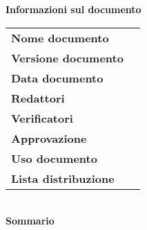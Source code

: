 \begin{center}
	\textbf{\Large Informazioni sul documento} \\[0.5cm]
	\begin{tabular}{ l | r }
		\textbf{Nome documento} & \doctitle \\
		\textbf{Versione documento} & \versiondoc \\
		\textbf{Data documento} & \datared \\
		\textbf{Redattori} & \redattore \\
		\textbf{Verificatori} & \verificatori \\
		\textbf{Approvazione} & \approvazione \\
		\textbf{Uso documento} & \usodoc \\
		\textbf{Lista distribuzione} & \listadistr \\
	\end{tabular} \\[1cm]
\textbf{\Large Sommario} \\[0.4cm]
\testosommario
\end{center}